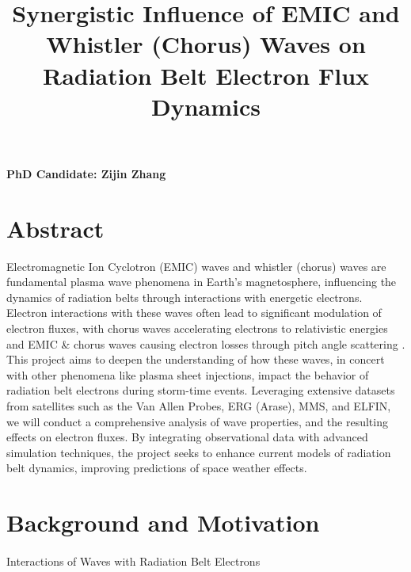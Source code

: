 \documentclass[
  letterpaper,
  DIV=11,
  numbers=noendperiod]{scrartcl}
\title{Synergistic Influence of EMIC and Whistler (Chorus) Waves on Radiation Belt Electron Flux Dynamics}
\author{}
\date{}
\makeatletter
\let\oldparagraph\paragraph
\renewcommand{\paragraph}{
    \@ifstar
      \xxxParagraphStar
      \xxxParagraphNoStar
  }
\newcommand{\xxxParagraphStar}[1]{\oldparagraph*{#1}\mbox{}}
\newcommand{\xxxParagraphNoStar}[1]{\oldparagraph{#1}\mbox{}}
\makeatother
\begin{document}
\maketitle

\vspace{-20truemm}

\textbf{PhD Candidate: Zijin Zhang}

\section{Abstract}\label{abstract}

Electromagnetic Ion Cyclotron (EMIC) waves and whistler (chorus) waves are fundamental plasma wave phenomena in Earth's magnetosphere, influencing the dynamics of radiation belts through interactions with energetic electrons. Electron interactions with these waves often lead to significant modulation of electron fluxes, with chorus waves accelerating electrons to relativistic energies \citep{miyoshiRebuildingProcessOuter2003} and EMIC \& chorus waves causing electron losses through pitch angle scattering \citep{summersRelativisticElectronPitchangle2003, summersTimescalesRadiationBelt2007}. This project aims to deepen the understanding of how these waves, in concert with other phenomena like plasma sheet injections, impact the behavior of radiation belt electrons during storm-time events. Leveraging extensive datasets from satellites such as the Van Allen Probes, ERG (Arase), MMS, and ELFIN, we will conduct a comprehensive analysis of wave properties, and the resulting effects on electron fluxes. By integrating observational data with advanced simulation techniques, the project seeks to enhance current models of radiation belt dynamics, improving predictions of space weather effects.

\section{Background and Motivation}\label{background-and-motivation}

\paragraph{Interactions of Waves with Radiation Belt Electrons}\label{interactions-of-waves-with-radiation-belt-electrons}
\end{document}
